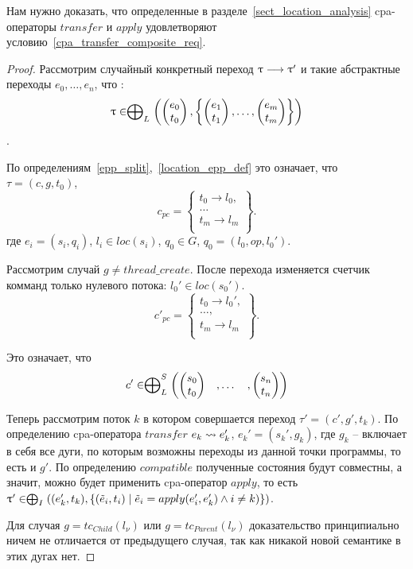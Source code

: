 Нам нужно доказать, что определенные в разделе~\ref{sect_location_analysis} cpa-операторы $transfer$ и $apply$ удовлетворяют условию~\ref{cpa_transfer_composite_req}.

\begin{proof}
Рассмотрим случайный конкретный переход $\uptau \longrightarrow \uptau'$ и такие абстрактные переходы $e_0, \dots, e_n$, что :
$$\uptau \in \mathrel{\bigoplus}_{L}
\left(
\begin{pmatrix}
e_0 \\
t_0 
\end{pmatrix},
\left\{
\begin{pmatrix}
e_1 \\
t_1 
\end{pmatrix},
\dots ,
\begin{pmatrix}
e_m \\
t_m 
\end{pmatrix}
\right\}
\right)$$.

По определениям~\ref{epp_split},~\ref{location_epp_def} это означает, что $\tau = (c, g, t_0)$,  
$$ c_{pc} = 
\left\lbrace
\begin{array}{c}
t_0 \to l_0,\\
\dots\\
t_m \to l_m\\
\end{array}
\right\rbrace.$$
где $e_i = (s_i, q_i)$, $l_i \in loc(s_i)$, $q_0 \in G$, $q_0 = (l_0, op, l_0')$.

Рассмотрим случай $g \neq thread\_create$. После перехода изменяется счетчик комманд только нулевого потока: $l_0' \in loc(s_0')$. $$ c'_{pc} = 
\left\lbrace
\begin{array}{c}
t_0 \to l_0',\\
\dots,\\
t_m \to l_m\\
\end{array}
\right\rbrace.$$

Это означает, что $$c' \in \mathrel{\bigoplus}^S_L 
\begin{pmatrix}
\begin{pmatrix}
s_0 \\
t_0 
\end{pmatrix}& ,
\dots& ,
\begin{pmatrix}
s_n \\
t_n 
\end{pmatrix}
\end{pmatrix}$$

Теперь рассмотрим поток $k$ в котором совершается переход $\tau' = (c', g', t_k)$. 
По определению cpa-оператора $transfer$ $e_k \leadsto e_k'$, $e_k' = (s_k', g_k)$, где $g_k$ -- включает в себя все дуги, по которым возможны переходы из данной точки программы, то есть и $g'$. 
По определению $compatible$ полученные состояния будут совместны, а значит, можно будет применить cpa-оператор $apply$, то есть
$\uptau' \in \mathrel{\bigoplus}_I((e_k', t_k), \{(\tilde{e}_i, t_i) \mid \tilde{e}_i = apply(e_i', e'_k) \land i \neq k)\})$.

Для случая $g = tc_{Child}(l_\nu)$ или $g = tc_{Parent}(l_\nu)$ доказательство принципиально ничем не отличается от предыдущего случая, так как никакой новой семантике в этих дугах нет. 
\end{proof}

